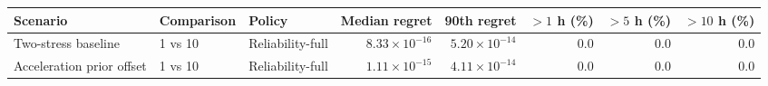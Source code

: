 \begin{tabular}{lllrrrrr}
\toprule
Scenario & Comparison & Policy & Median regret & 90th regret & $>1$ h (\%) & $>5$ h (\%) & $>10$ h (\%) \\
\midrule
Two-stress baseline & 1 vs 10 & Reliability-full & $8.33\times10^{-16}$ & $5.20\times10^{-14}$ & 0.0 & 0.0 & 0.0 \\
Acceleration prior offset & 1 vs 10 & Reliability-full & $1.11\times10^{-15}$ & $4.11\times10^{-14}$ & 0.0 & 0.0 & 0.0 \\
\bottomrule
\end{tabular}
